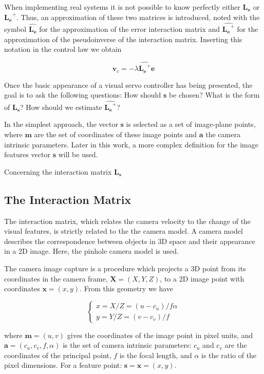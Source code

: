 When implementing real systems it is not possible to know perfectly either $\bm{L_e}$ or $\bm{L_e}^{+}$. Thus, an approximation of these two matrices is introduced, noted with the symbol $\widehat{\bm{L_e}}$ for the approximation of the error interaction matrix and $\widehat{\bm{L_e}^+}$ for the approximation of the pseudoinverse of the interaction matrix. Inserting this notation in the control law we obtain

\begin{equation}
\bm{v}_c = - \lambda \widehat{\bm{L_e}^+} \bm{e}
\label{eq:vs-th-5}
\end{equation}

Once the basic appearance of a visual servo controller has being presented, the goal is to ask the following questions: How should $\bm{s}$ be chosen?  What is the form of $\bm{L_s}$? How should we estimate $\widehat{\bm{L_e}^+}$?

In the simplest approach, the vector $\bm{s}$ is selected as a set of image-plane points, where $\bm{m}$ are the set of coordinates of these  image points and $\bm{a}$ the camera intrinsic parameters. Later in this work, a more complex definition for the image features vector $\bm{s}$ will be used.

Concerning the interaction matrix $\bm{L_s}$ 

\subsection*{The Interaction Matrix}

The interaction matrix, which relates the camera velocity to the change of the visual features, is strictly related to the the camera model. A camera model describes the correspondence between objects in 3D space and their appearance in a 2D image. Here, the pinhole camera model is used.

The camera image capture is a procedure which projects a 3D point from its coordinates in the camera frame, $\bm{X} = (X, Y, Z)$, to a 2D image point with coordinates $\bm{x} = (x, y)$. From this geometry we have

\begin{equation}
\begin{cases}
x = X/Z = (u - c_u) / f \alpha \\
y = Y/Z = (v - c_v) / f
\end{cases}
\label{eq:vs-th-6}
\end{equation}

where $\bm{m} = (u, v)$ gives the coordinates of the image point in pixel units, and $\bm{a} = (c_u, c_v, f, \alpha)$ is the set of camera intrinsic parameters: $c_u$ and $c_v$ are the coordinates of the principal point, $f$ is the focal length, and $\alpha$ is the ratio of the pixel dimensions. For a feature point: $\bm{s} = \bm{x} = (x, y)$.

